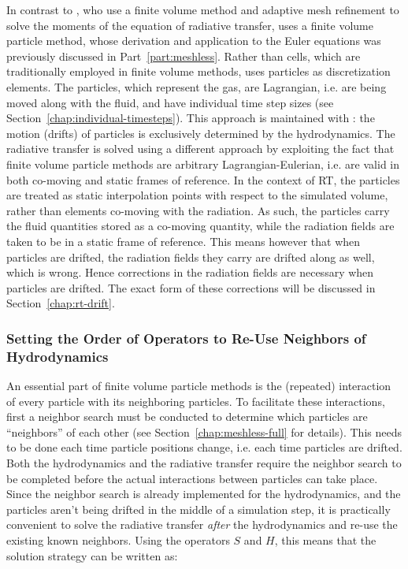 In contrast to \cite{ramses-rt13}, who use a finite volume method and adaptive mesh refinement to
solve the moments of the equation of radiative transfer, \GEARRT uses a finite volume particle
method, whose derivation and application to the Euler equations was previously discussed in
Part~\ref{part:meshless}. Rather than cells, which are traditionally employed in finite volume
methods, \GEARRT uses particles as discretization elements. The particles, which represent the gas,
are Lagrangian, i.e. are being moved along with the fluid, and have individual time step sizes (see
Section~\ref{chap:individual-timesteps}).
This approach is maintained with \GEARRT: the motion (drifts) of particles is exclusively determined
by the hydrodynamics. The radiative transfer is solved using a different approach by exploiting the
fact that finite volume particle methods are arbitrary Lagrangian-Eulerian, i.e. are valid in both
co-moving and static frames of reference. In the context of RT, the particles are treated as static
interpolation points with respect to the simulated volume, rather than elements co-moving with the
radiation. As such, the particles carry the fluid quantities stored as a co-moving quantity, while
the radiation fields are taken to be in a static frame of reference. This means however that when
particles are drifted, the radiation fields they carry are drifted along as well, which is wrong.
Hence corrections in the radiation fields are necessary when particles are drifted. The exact form
of these corrections will be discussed in Section~\ref{chap:rt-drift}.










\subsubsection{Setting the Order of Operators to Re-Use Neighbors of Hydrodynamics}

An essential part of finite volume particle methods is the (repeated) interaction of every particle
with its neighboring particles. To facilitate these interactions, first a neighbor search must be
conducted to determine which particles are ``neighbors'' of each other (see
Section~\ref{chap:meshless-full} for details). This needs to be done each time particle positions
change, i.e. each time particles are drifted. Both the hydrodynamics and the radiative transfer
require the neighbor search to be completed before the actual interactions between particles can
take place. Since the neighbor search is already implemented for the hydrodynamics, and the
particles aren't being drifted in the middle of a simulation step, it is practically convenient to
solve the radiative transfer \emph{after} the hydrodynamics and re-use the existing known neighbors.
Using the operators $S$ and $H$, this means that the solution strategy can be written as:

